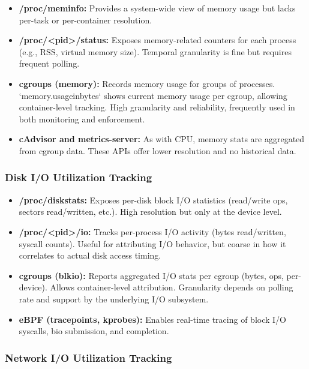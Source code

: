 \begin{itemize}
    \item \textbf{/proc/meminfo:} Provides a system-wide view of memory usage but lacks per-task or per-container resolution.
    \item \textbf{/proc/\textless pid\textgreater/status:} Exposes memory-related counters for each process (e.g., RSS, virtual memory size). Temporal granularity is fine but requires frequent polling.
    \item \textbf{cgroups (memory):} Records memory usage for groups of processes. `memory.usage\textunderscore in\textunderscore bytes` shows current memory usage per cgroup, allowing container-level tracking. High granularity and reliability, frequently used in both monitoring and enforcement.
    \item \textbf{cAdvisor and metrics-server:} As with CPU, memory stats are aggregated from cgroup data. These APIs offer lower resolution and no historical data.
\end{itemize}

\subsubsection*{Disk I/O Utilization Tracking}

\begin{itemize}
    \item \textbf{/proc/diskstats:} Exposes per-disk block I/O statistics (read/write ops, sectors read/written, etc.). High resolution but only at the device level.
    \item \textbf{/proc/\textless pid\textgreater/io:} Tracks per-process I/O activity (bytes read/written, syscall counts). Useful for attributing I/O behavior, but coarse in how it correlates to actual disk access timing.
    \item \textbf{cgroups (blkio):} Reports aggregated I/O stats per cgroup (bytes, ops, per-device). Allows container-level attribution. Granularity depends on polling rate and support by the underlying I/O subsystem.
    \item \textbf{eBPF (tracepoints, kprobes):} Enables real-time tracing of block I/O syscalls, bio submission, and completion.
\end{itemize}

\subsubsection*{Network I/O Utilization Tracking}

